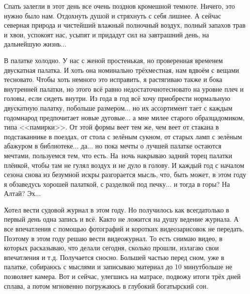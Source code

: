 Спать залегли в этот день все очень поздно\mdash в кромешной темноте. Ничего, это нужно было нам. Отдохнуть душой и стряхнуть с себя лишнее. А сейчас северная природа и чистейший влажный полночный воздух, полный запахов трав и хвои, успокоят нас, усыпят и придадут сил на завтрашний день, на дальнейшую жизнь$\ldots$ 

В палатке холодно. У нас с женой простенькая, но проверенная временем двускатная палатка. И хоть она номинально трёхместная, нам вдвоём с вещами тесновато. Чтобы хоть немного это исправить, я растягиваю также и бока внутренней палатки, но этого всё равно недостаточно\mdash тесновато на уровне плеч и головы, если сидеть внутри. Из года в год всё хочу приобрести нормальную двускатную палатку, побольше размером$\ldots$ но их ассортимент тает с каждым годом\mdash народ предпочитает новые дуговые$\ldots$ а мне милее старого образца\mdash домиком, типа <<памирки>>. От этой формы веет тем же, чем веет от стакана в подстаканнике в поездах, от стола с зелёным сукном, от старых ламп с зелёным абажуром в библиотеке$\ldots$ да$\ldots$ но пока мечты о лучшей палатке остаются мечтами, пользуемся тем, что есть. На~ночь накрываю задний торец палатки плёнкой, чтобы там не гулял воздух и не дуло в голову. И каждый год с началом сезона снова из безумной искры разгорается мысль, что, быть может, в этом году я обзаведусь хорошей палаткой, с разделкой под печку$\ldots$ и тогда в горы? На Алтай? Эх$\ldots$

Хотел вести судовой журнал в этом году. Но получилось как всегда\mdash только в первый день одна запись и всё. Как\sdash то не ложится на душу ведение журнала. А все впечатления с помощью фотографий и коротких видеозарисовок не передать. Поэтому в этом году решаю вести видеожурнал. То есть снимаю видео, в которых расказываю, что делали сегодня, сколько прошли, излагаю свои впечатления и т.д. Получается сносно. Большей частью перед сном, уже в палатке, собираюсь с мыслями и записываю материал до 10 минут\mdash больше не позволяет камера. Вот и сейчас, улегшись на матрасе, подвожу итоги трёх дней сплава, а потом мгновенно погружаюсь в глубокий богатырский сон.

\begin{center}
\end{center}
